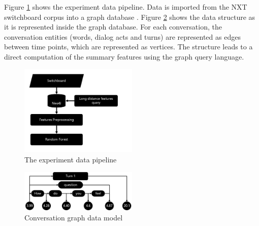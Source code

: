     Figure \ref{pipeline} shows the experiment data pipeline. Data is imported from the NXT switchboard corpus \cite{calhoun2010nxt} into a graph database \cite{Webber:2012:PIN:2384716.2384777}.
   Figure \ref{datastructure} shows the data structure as it is represented inside the graph database. For each conversation, the conversation entities (words, dialog acts and turns) are represented as edges between time points, which are represented as vertices. The structure leads to a direct computation of the summary features using the graph query language.
\begin{figure}[ht!]
 \centering
 \includegraphics[width=0.5\textwidth,natwidth=610,natheight=610]{pipeline1.pdf}
 \caption{The experiment data pipeline
 \label{pipeline}}
 \end{figure}

 \begin{figure}[ht!]
 \centering
 \includegraphics[width=0.5\textwidth,natwidth=610,natheight=642]{graph5.jpg}
 \caption{Conversation graph data model \label{datastructure}}
 \end{figure}

